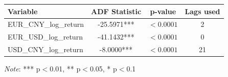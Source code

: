 \begin{tabular}{lccc}
  \toprule
  \textbf{Variable} & \textbf{ADF Statistic} & \textbf{p-value} & \textbf{Lags used} \\ 
  \midrule
  EUR\_CNY\_log\_return & -25.5971*** & $< 0.0001$ & 2 \\ 
  EUR\_USD\_log\_return & -41.1432*** & $< 0.0001$ & 0 \\ 
  USD\_CNY\_log\_return & -8.0000*** & $< 0.0001$ & 21 \\ 
  \bottomrule
\end{tabular}
\par\vspace{4pt}
\begin{minipage}{\linewidth}
  \footnotesize \textit{Note}: *** p$<$0.01, ** p$<$0.05, * p$<$0.1
\end{minipage}